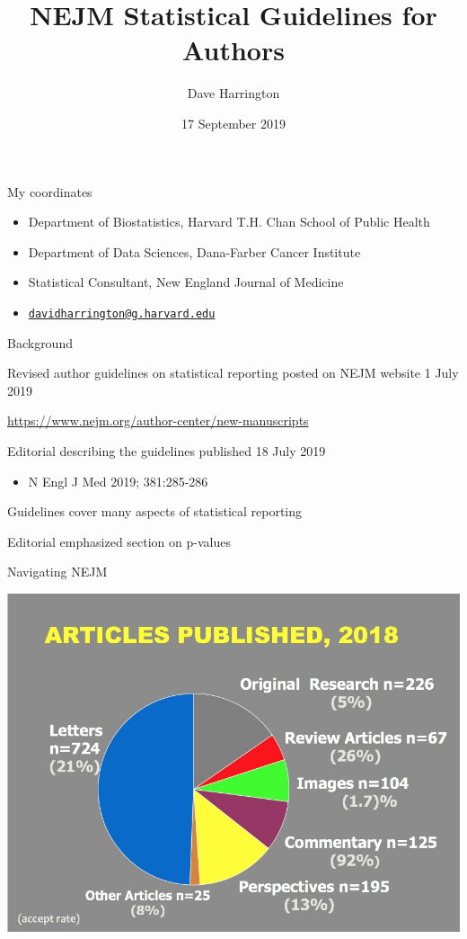 \documentclass[ignorenonframetext,]{beamer}
\title{NEJM Statistical Guidelines for Authors}
\author{Dave Harrington}
\date{17 September 2019}
\providecommand{\tightlist}{%
  \setlength{\itemsep}{0pt}\setlength{\parskip}{0pt}}
\begin{document}
\frame{\titlepage}

\begin{frame}{My coordinates}
\protect\hypertarget{my-coordinates}{}

\begin{itemize}
\item
  Department of Biostatistics, Harvard T.H. Chan School of Public Health
\item
  Department of Data Sciences, Dana-Farber Cancer Institute
\item
  Statistical Consultant, New England Journal of Medicine
\item
  \href{mailto:davidharrington@g.harvard.edu}{\nolinkurl{davidharrington@g.harvard.edu}}
\end{itemize}

\end{frame}

\begin{frame}{Background}
\protect\hypertarget{background}{}

Revised author guidelines on statistical reporting posted on NEJM
website 1 July 2019

\url{https://www.nejm.org/author-center/new-manuscripts}

Editorial describing the guidelines published 18 July 2019

\begin{itemize}
\tightlist
\item
  N Engl J Med 2019; 381:285-286
\end{itemize}

Guidelines cover many aspects of statistical reporting

Editorial emphasized section on p-values

\end{frame}

\begin{frame}{Navigating NEJM}
\protect\hypertarget{navigating-nejm}{}

\centering

\includegraphics[width=1\textwidth,height=\textheight]{../figures/articles_published_2018.jpeg}

\end{frame}
\end{document}
